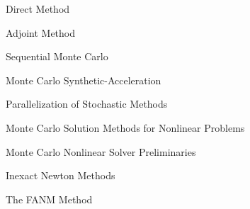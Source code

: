 \documentclass{beamer}
\begin{document}
\begin{frame}{Direct Method}

\end{frame}

\begin{frame}{Adjoint Method}

\end{frame}

\begin{frame}{Sequential Monte Carlo}

\end{frame}

\begin{frame}{Monte Carlo Synthetic-Acceleration}

\end{frame}

\begin{frame}{Parallelization of Stochastic Methods}

\end{frame}

\begin{frame}{Monte Carlo Solution Methods for Nonlinear Problems}

\end{frame}

\begin{frame}{Monte Carlo Nonlinear Solver Preliminaries}

\end{frame}

\begin{frame}{Inexact Newton Methods}

\end{frame}

\begin{frame}{The FANM Method}

\end{frame}
\end{document}

